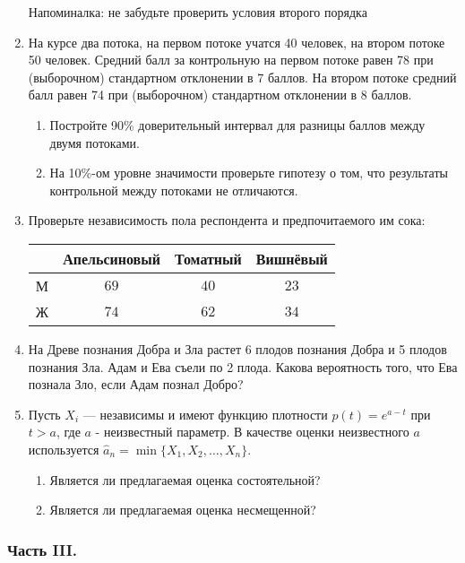 \begin{enumerate}
Напоминалка: не забудьте проверить условия второго порядка

\item На курсе два потока, на первом потоке учатся 40 человек, на втором
потоке 50 человек. Средний балл за контрольную на первом потоке
равен 78 при (выборочном) стандартном отклонении в 7 баллов. На
втором потоке средний балл равен 74 при (выборочном) стандартном
отклонении в 8 баллов.
\begin{enumerate}
\item Постройте 90\% доверительный интервал для разницы баллов между
двумя потоками.
\item На 10\%-ом уровне значимости проверьте гипотезу о том, что
результаты контрольной между потоками не отличаются.
\end{enumerate}


\item Проверьте независимость пола респондента и предпочитаемого
им сока:

\begin{tabular}{@{}cccc@{}}
\toprule
  & Апельсиновый & Томатный & Вишнёвый \\ \midrule
М & $69$         & $40$     & $23$     \\
Ж & $74$         & $62$     & $34$     \\ \bottomrule
\end{tabular}

\item На Древе познания Добра и Зла растет 6 плодов познания Добра и 5 плодов познания Зла. Адам и Ева съели по 2 плода. Какова вероятность того, что Ева познала Зло, если Адам познал Добро?

\item Пусть $X_{i}$ — независимы и имеют функцию плотности $p(t)=e^{a-t}$ при $t>a$, где $a$ - неизвестный параметр. В качестве оценки неизвестного $a$ используется $\hat{a}_{n}=\min\{X_{1},X_{2}, \ldots, X_{n}\}$.
\begin{enumerate}
\item Является ли предлагаемая оценка состоятельной?
\item Является ли предлагаемая оценка несмещенной?
\end{enumerate}


\end{enumerate}

\subsubsection*{Часть III.}

